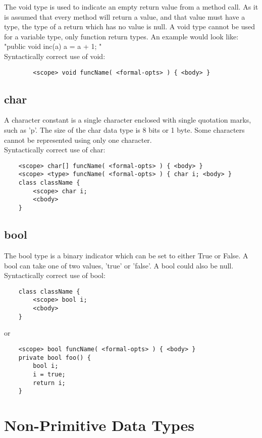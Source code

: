 \begin{homeworkProblem}
	The void type is used to indicate an empty return value from a method call. As it is assumed that every method will return a value, and that value must have a type, the type of a return which has no value is null. A void type cannot be used for a variable type, only function return types. An example would look like: "public void inc(a) { a = a + 1; }" \\

	Syntactically correct use of void:


\begin{verbatim}
		<scope> void funcName( <formal-opts> ) { <body> }
	\end{verbatim}


	\subsection{char}

	A character constant is a single character enclosed with single quotation marks, such as 'p'. The size of the char data type is 8 bits or 1 byte. Some characters cannot be represented using only one character.\\

	Syntactically correct use of char:


	\begin{verbatim}
	<scope> char[] funcName( <formal-opts> ) { <body> }
	<scope> <type> funcName( <formal-opts> ) { char i; <body> }
	class className {
		<scope> char i;
		<cbody>
	}
	\end{verbatim}


	\subsection{bool}

	The bool type is a binary indicator which can be set to either True or False. A bool can take one of two values, 'true' or 'false'. A bool could also be null.\\

	Syntactically correct use of bool:

	\begin{verbatim}	
	class className {
		<scope> bool i;
		<cbody>
	}
	\end{verbatim}
	or
	\begin{verbatim}
	<scope> bool funcName( <formal-opts> ) { <body> }
	private bool foo() {
		bool i;
		i = true;
		return i;
	}
	\end{verbatim}
	\section{Non-Primitive Data Types}

\end{homeworkProblem}
